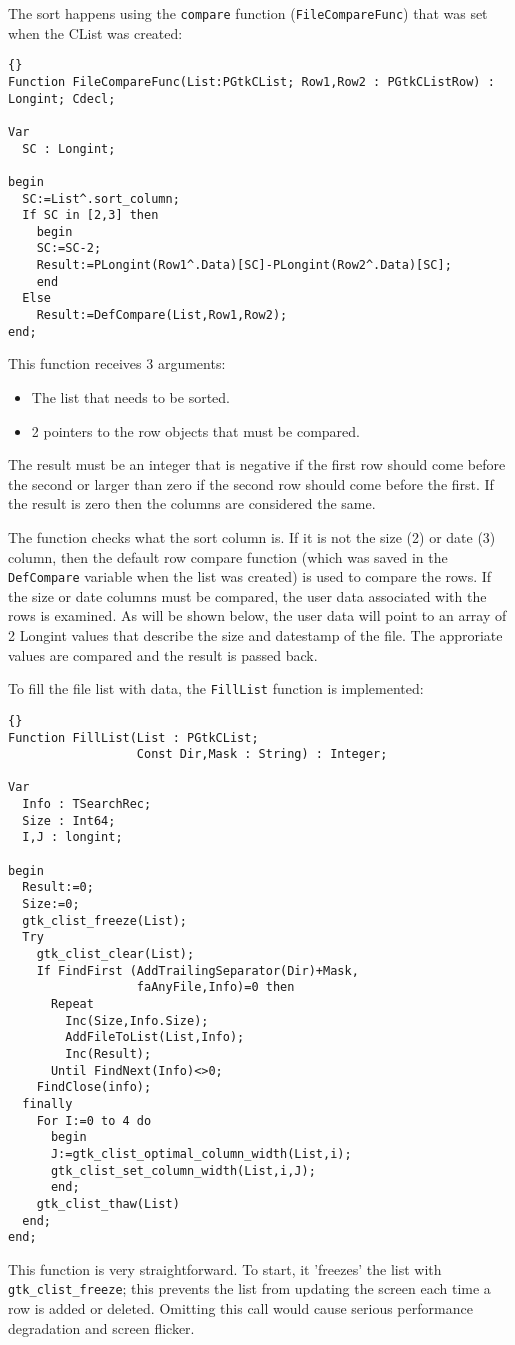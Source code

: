 \documentclass[10pt]{article}
\begin{document}
The sort happens using the \lstinline|compare| function (\lstinline|FileCompareFunc|)
that was set when the CList was created:
\begin{lstlisting}{}
Function FileCompareFunc(List:PGtkCList; Row1,Row2 : PGtkCListRow) : Longint; Cdecl;

Var 
  SC : Longint;

begin
  SC:=List^.sort_column;
  If SC in [2,3] then
    begin
    SC:=SC-2;
    Result:=PLongint(Row1^.Data)[SC]-PLongint(Row2^.Data)[SC];
    end
  Else
    Result:=DefCompare(List,Row1,Row2);  
end;
\end{lstlisting}
This function receives 3 arguments:
\begin{itemize}
\item The list that needs to be sorted.
\item 2 pointers to the row objects that must be compared.
\end{itemize}
The result must be an integer that is negative if the first row should come
before the second or larger than zero if the second row should come before
the first. If the result is zero then the columns are considered the same.

The function checks what the sort column is. If it is not the size (2) or 
date (3) column, then the default row compare function (which was saved in 
the \lstinline|DefCompare| variable when the list was created) is used to
compare the rows. If the size or date columns must be compared, the user 
data associated with the rows is examined. As will be shown below, the user
data will point to an array of 2 Longint values that describe the size and
datestamp of the file. The approriate values are compared and the result is 
passed back.

To fill the file list with data, the \lstinline|FillList| function is 
implemented:
\begin{lstlisting}{}
Function FillList(List : PGtkCList; 
                  Const Dir,Mask : String) : Integer;

Var
  Info : TSearchRec;
  Size : Int64;
  I,J : longint;
  
begin
  Result:=0;
  Size:=0;
  gtk_clist_freeze(List);
  Try
    gtk_clist_clear(List);
    If FindFirst (AddTrailingSeparator(Dir)+Mask,
                  faAnyFile,Info)=0 then
      Repeat
        Inc(Size,Info.Size);
        AddFileToList(List,Info);
        Inc(Result);
      Until FindNext(Info)<>0;
    FindClose(info);
  finally
    For I:=0 to 4 do
      begin
      J:=gtk_clist_optimal_column_width(List,i);
      gtk_clist_set_column_width(List,i,J);
      end;
    gtk_clist_thaw(List)
  end;
end;
\end{lstlisting}
This function is very straightforward. To start, it 'freezes' the list with
\lstinline|gtk_clist_freeze|; this prevents the list from updating the
screen each time a row is added or deleted. Omitting this call would cause
serious performance degradation and screen flicker.
\end{document}

